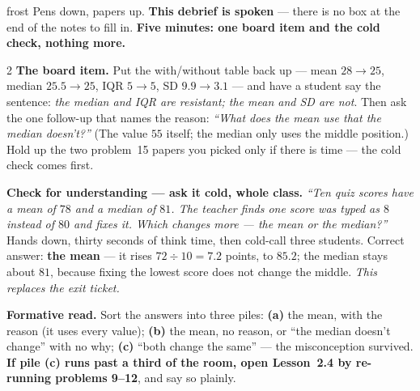 \documentclass[10pt]{article}
\begin{document}
\boxguard[24]
\begin{skillbox}{frost}
Pens down, papers up. \textbf{This debrief is spoken} --- there is no box at the end of the
notes to fill in. \textbf{Five minutes: one board item and the cold check, nothing more.}
\begin{multicols}{2}
\textbf{The board item.} Put the with/without table back up --- mean $28 \to 25$, median
$25.5 \to 25$, IQR $5 \to 5$, SD $9.9 \to 3.1$ --- and have a student say the sentence:
\emph{the median and IQR are resistant; the mean and SD are not}. Then ask the one follow-up
that names the reason: \emph{``What does the mean use that the median doesn't?''} (The value
$55$ itself; the median only uses the middle position.) Hold up the two problem~15 papers you
picked only if there is time --- the cold check comes first.

\columnbreak
\textbf{Check for understanding --- ask it cold, whole class.} \emph{``Ten quiz scores have a
mean of $78$ and a median of $81$. The teacher finds one score was typed as $8$ instead of
$80$ and fixes it. Which changes more --- the mean or the median?''} Hands down, thirty seconds
of think time, then cold-call three students. Correct answer: \textbf{the mean} --- it rises
$72 \div 10 = 7.2$ points, to $85.2$; the median stays about $81$, because fixing the lowest
score does not change the middle. \emph{This replaces the exit ticket.}

\textbf{Formative read.} Sort the answers into three piles: \textbf{(a)} the mean, with the
reason (it uses every value); \textbf{(b)} the mean, no reason, or ``the median doesn't change''
with no why; \textbf{(c)} ``both change the same'' --- the misconception survived. \textbf{If
pile (c) runs past a third of the room, open Lesson~2.4 by re-running problems 9--12}, and say
so plainly.
\end{multicols}
\end{skillbox}
\end{document}
